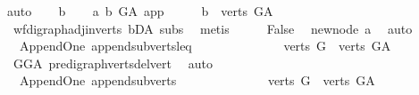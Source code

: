 \begin{isabellebody}
%
\isadelimproof
%
\endisadelimproof
%
\isatagproof
{}\isamarkupfalse%
{\isacharparenleft}{\kern0pt}auto{\isacharparenright}{\kern0pt}\isanewline
\ \ \isamarkupfalse%
\ b\isanewline
\ \ \isamarkupfalse%
\ a{}{\isacharcolon}{\kern0pt}\ {\isachardoublequoteopen}b\ {\isasymrightarrow}\isactrlbsub G{\isacharunderscore}{\kern0pt}A\isactrlesub \ app{\isachardoublequoteclose}\isanewline
\ \ \isamarkupfalse%
\ \isamarkupfalse%
\ {\isachardoublequoteopen}b\ {\isasymin}\ verts\ G{\isacharunderscore}{\kern0pt}A{\isachardoublequoteclose}\ \isamarkupfalse%
\ wf{\isacharunderscore}{\kern0pt}digraph{\isachardot}{\kern0pt}adj{\isacharunderscore}{\kern0pt}in{\isacharunderscore}{\kern0pt}verts{\isacharparenleft}{\kern0pt}{}{\isacharparenright}{\kern0pt}\ bD{\isacharunderscore}{\kern0pt}A\ subs\ \isamarkupfalse%
\ metis\isanewline
\ \ \isamarkupfalse%
\ \isamarkupfalse%
\ {\isachardoublequoteopen}False{\isachardoublequoteclose}\ \isamarkupfalse%
\ new{\isacharunderscore}{\kern0pt}node\ a{}\ \isamarkupfalse%
\ auto\isanewline
{}\isamarkupfalse%
%
\endisatagproof
{\isafoldproof}%
%
\isadelimproof
\isanewline
%
\endisadelimproof
\isanewline
\isanewline
{}\isamarkupfalse%
\ {\isacharparenleft}{\kern0pt}\ Append{\isacharunderscore}{\kern0pt}One{\isacharparenright}{\kern0pt}\ append{\isacharunderscore}{\kern0pt}subverts{\isacharunderscore}{\kern0pt}leq{\isacharcolon}{\kern0pt}\ \ \ \ \ \ \ \ \ \ \ \ \isanewline
\ \ {\isachardoublequoteopen}verts\ G\ {\isasymsubseteq}\ verts\ G{\isacharunderscore}{\kern0pt}A{\isachardoublequoteclose}\isanewline
%
\isadelimproof
\ \ %
\endisadelimproof
%
\isatagproof
{}\isamarkupfalse%
\ GG{\isacharunderscore}{\kern0pt}A\ pre{\isacharunderscore}{\kern0pt}digraph{\isachardot}{\kern0pt}verts{\isacharunderscore}{\kern0pt}del{\isacharunderscore}{\kern0pt}vert\ \isamarkupfalse%
\ auto%
\endisatagproof
{\isafoldproof}%
%
\isadelimproof
\isanewline
%
\endisadelimproof
\isanewline
{}\isamarkupfalse%
\ {\isacharparenleft}{\kern0pt}\ Append{\isacharunderscore}{\kern0pt}One{\isacharparenright}{\kern0pt}\ append{\isacharunderscore}{\kern0pt}subverts{\isacharcolon}{\kern0pt}\ \ \ \ \ \ \ \ \ \ \ \ \isanewline
\ \ {\isachardoublequoteopen}verts\ G\ {\isasymsubset}\ verts\ G{\isacharunderscore}{\kern0pt}A{\isachardoublequoteclose}\isanewline

\end{isabellebody}
